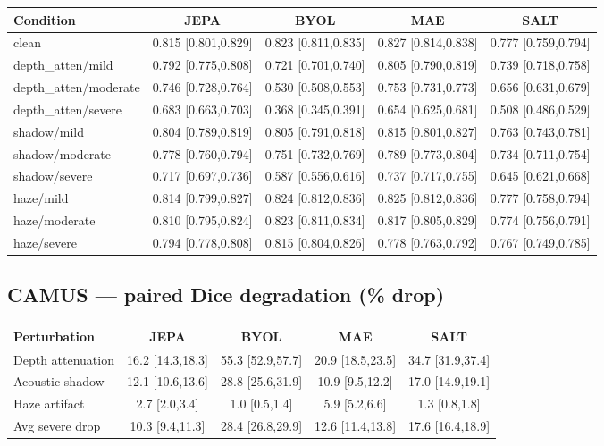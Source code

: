 \documentclass{article}
\begin{document}
\begin{center}
\small
\begin{tabular}{lcccc}
\toprule
Condition & JEPA & BYOL & MAE & SALT \\
\midrule
clean                 & 0.815 [0.801,0.829] & 0.823 [0.811,0.835] & 0.827 [0.814,0.838] & 0.777 [0.759,0.794] \\
depth\_atten/mild     & 0.792 [0.775,0.808] & 0.721 [0.701,0.740] & 0.805 [0.790,0.819] & 0.739 [0.718,0.758] \\
depth\_atten/moderate & 0.746 [0.728,0.764] & 0.530 [0.508,0.553] & 0.753 [0.731,0.773] & 0.656 [0.631,0.679] \\
depth\_atten/severe   & 0.683 [0.663,0.703] & 0.368 [0.345,0.391] & 0.654 [0.625,0.681] & 0.508 [0.486,0.529] \\
shadow/mild           & 0.804 [0.789,0.819] & 0.805 [0.791,0.818] & 0.815 [0.801,0.827] & 0.763 [0.743,0.781] \\
shadow/moderate       & 0.778 [0.760,0.794] & 0.751 [0.732,0.769] & 0.789 [0.773,0.804] & 0.734 [0.711,0.754] \\
shadow/severe         & 0.717 [0.697,0.736] & 0.587 [0.556,0.616] & 0.737 [0.717,0.755] & 0.645 [0.621,0.668] \\
haze/mild             & 0.814 [0.799,0.827] & 0.824 [0.812,0.836] & 0.825 [0.812,0.836] & 0.777 [0.758,0.794] \\
haze/moderate         & 0.810 [0.795,0.824] & 0.823 [0.811,0.834] & 0.817 [0.805,0.829] & 0.774 [0.756,0.791] \\
haze/severe           & 0.794 [0.778,0.808] & 0.815 [0.804,0.826] & 0.778 [0.763,0.792] & 0.767 [0.749,0.785] \\
\bottomrule
\end{tabular}
\end{center}

\subsection{CAMUS --- paired Dice degradation (\% drop)}

\begin{center}
\begin{tabular}{lcccc}
\toprule
Perturbation & JEPA & BYOL & MAE & SALT \\
\midrule
Depth attenuation & 16.2 [14.3,18.3] & 55.3 [52.9,57.7] & 20.9 [18.5,23.5] & 34.7 [31.9,37.4] \\
Acoustic shadow   & 12.1 [10.6,13.6] & 28.8 [25.6,31.9] & 10.9 [9.5,12.2]  & 17.0 [14.9,19.1] \\
Haze artifact     & 2.7 [2.0,3.4]    & 1.0 [0.5,1.4]    & 5.9 [5.2,6.6]    & 1.3 [0.8,1.8] \\
Avg severe drop   & 10.3 [9.4,11.3]  & 28.4 [26.8,29.9] & 12.6 [11.4,13.8] & 17.6 [16.4,18.9] \\
\bottomrule
\end{tabular}
\end{center}
\end{document}

